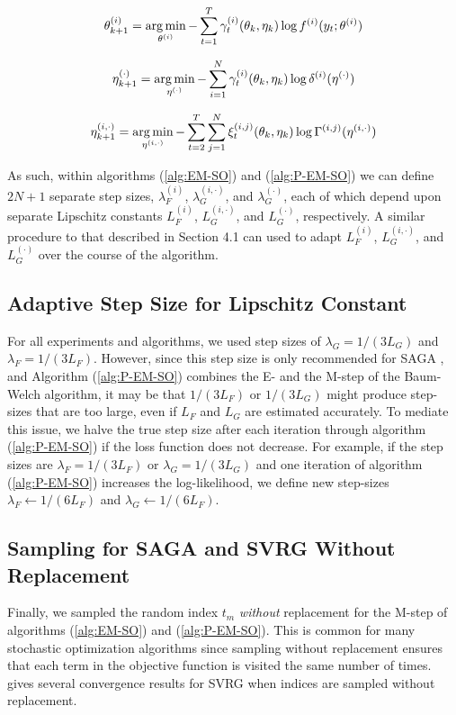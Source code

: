 \begin{equation} 
    \theta^{(i)}_{k+1} = \operatorname*{arg\,min}_{\theta^{(i)}} - \sum_{t=1}^T \gamma^{(i)}_t(\theta_{k}, \eta_{k}) \log f^{(i)}(y_t;\theta^{(i)})
\end{equation}

\begin{equation}
    \eta^{(\cdot)}_{k+1} = \operatorname*{arg\,min}_{\eta^{(\cdot)}} - \sum_{i=1}^N \gamma^{(i)}_t(\theta_{k},\eta_{k}) \log \delta^{(i)}(\eta^{(\cdot)})
\end{equation}

\begin{equation}
    \eta^{(i,\cdot)}_{k+1} = \operatorname*{arg\,min}_{\eta^{(i,\cdot)}} - \sum_{t=2}^T \sum_{j=1}^N \xi^{(i,j)}_t(\theta_{k}, \eta_{k}) \log \Gamma^{(i,j)}(\eta^{(i,\cdot)})
\end{equation}

As such, within algorithms (\ref{alg:EM-SO}) and (\ref{alg:P-EM-SO}) we can define $2N+1$ separate step sizes, $\lambda_F^{(i)}$, $\lambda_G^{(i,\cdot)}$, and $\lambda_G^{(\cdot)}$, each of which depend upon separate Lipschitz constants $L_F^{(i)}$, $L_G^{(i,\cdot)}$, and $L_G^{(\cdot)}$, respectively. A similar procedure to that described in Section 4.1 can used to adapt $L_F^{(i)}$, $L_G^{(i,\cdot)}$, and $L_G^{(\cdot)}$ over the course of the algorithm.

\subsection{Adaptive Step Size for Lipschitz Constant}
\label{subsec:L_divider}

For all experiments and algorithms, we used step sizes of $\lambda_G = 1/(3L_G)$ and $\lambda_F = 1/(3L_F)$. However, since this step size is only recommended for SAGA \citep{Defazio:2014}, and Algorithm (\ref{alg:P-EM-SO}) combines the E- and the M-step of the Baum-Welch algorithm, it may be that $1/(3L_F)$ or $1/(3L_G)$ might produce step-sizes that are too large, even if $L_F$ and $L_G$ are estimated accurately. To mediate this issue, we halve the true step size after each iteration through algorithm (\ref{alg:P-EM-SO}) if the loss function does not decrease. For example, if the step sizes are $\lambda_F = 1/(3L_F)$ or $\lambda_G = 1/(3L_G)$ and one iteration of algorithm (\ref{alg:P-EM-SO}) increases the log-likelihood, we define new step-sizes $\lambda_F \leftarrow 1/(6L_F)$ and $\lambda_G \leftarrow 1/(6L_F)$.

\subsection{Sampling for SAGA and SVRG Without Replacement}
\label{subsec:wo_replacement}

Finally, we sampled the random index $t_m$ \textit{without} replacement for the M-step of algorithms (\ref{alg:EM-SO}) and (\ref{alg:P-EM-SO}). This is common for many stochastic optimization algorithms since sampling without replacement ensures that each term in the objective function is visited the same number of times. \citet{Ohad:2016} gives several convergence results for SVRG when indices are sampled without replacement.